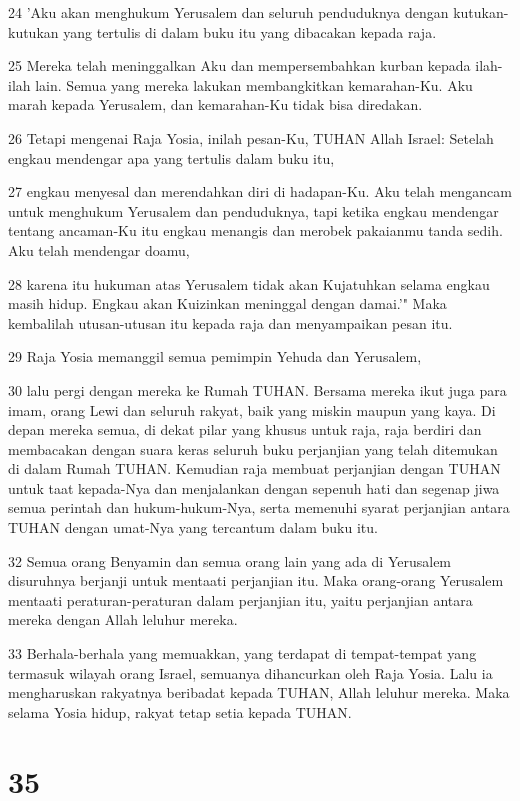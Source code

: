 \par 24 'Aku akan menghukum Yerusalem dan seluruh penduduknya dengan kutukan-kutukan yang tertulis di dalam buku itu yang dibacakan kepada raja.
\par 25 Mereka telah meninggalkan Aku dan mempersembahkan kurban kepada ilah-ilah lain. Semua yang mereka lakukan membangkitkan kemarahan-Ku. Aku marah kepada Yerusalem, dan kemarahan-Ku tidak bisa diredakan.
\par 26 Tetapi mengenai Raja Yosia, inilah pesan-Ku, TUHAN Allah Israel: Setelah engkau mendengar apa yang tertulis dalam buku itu,
\par 27 engkau menyesal dan merendahkan diri di hadapan-Ku. Aku telah mengancam untuk menghukum Yerusalem dan penduduknya, tapi ketika engkau mendengar tentang ancaman-Ku itu engkau menangis dan merobek pakaianmu tanda sedih. Aku telah mendengar doamu,
\par 28 karena itu hukuman atas Yerusalem tidak akan Kujatuhkan selama engkau masih hidup. Engkau akan Kuizinkan meninggal dengan damai.'" Maka kembalilah utusan-utusan itu kepada raja dan menyampaikan pesan itu.
\par 29 Raja Yosia memanggil semua pemimpin Yehuda dan Yerusalem,
\par 30 lalu pergi dengan mereka ke Rumah TUHAN. Bersama mereka ikut juga para imam, orang Lewi dan seluruh rakyat, baik yang miskin maupun yang kaya. Di depan mereka semua, di dekat pilar yang khusus untuk raja, raja berdiri dan membacakan dengan suara keras seluruh buku perjanjian yang telah ditemukan di dalam Rumah TUHAN. Kemudian raja membuat perjanjian dengan TUHAN untuk taat kepada-Nya dan menjalankan dengan sepenuh hati dan segenap jiwa semua perintah dan hukum-hukum-Nya, serta memenuhi syarat perjanjian antara TUHAN dengan umat-Nya yang tercantum dalam buku itu.
\par 32 Semua orang Benyamin dan semua orang lain yang ada di Yerusalem disuruhnya berjanji untuk mentaati perjanjian itu. Maka orang-orang Yerusalem mentaati peraturan-peraturan dalam perjanjian itu, yaitu perjanjian antara mereka dengan Allah leluhur mereka.
\par 33 Berhala-berhala yang memuakkan, yang terdapat di tempat-tempat yang termasuk wilayah orang Israel, semuanya dihancurkan oleh Raja Yosia. Lalu ia mengharuskan rakyatnya beribadat kepada TUHAN, Allah leluhur mereka. Maka selama Yosia hidup, rakyat tetap setia kepada TUHAN.

\chapter{35}

